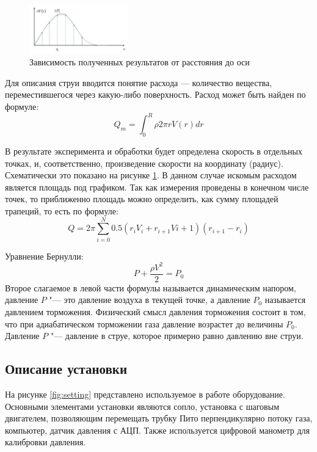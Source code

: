             \begin{figure}
                \includegraphics[width=0.38\textwidth]{data_example}
                \caption{Зависимость полученных результатов от расстояния до оси}
                \label{fig:data}
            \end{figure}
            Для описания струи вводится понятие расхода --- количество вещества, переместившегося через какую-либо поверхность. Расход может быть найден по формуле:
            \begin{equation}
                \label{eq:expence}
                Q_m = \int_0^R \rho 2\pi rV(r)dr
            \end{equation}

            В результате эксперимента и обработки будет определена скорость в отдельных точках, и, соответственно, произведение скорости на координату (радиус). Схематически это показано на рисунке \ref{fig:data}. В данном случае искомым расходом является площадь под графиком. Так как измерения проведены в конечном числе точек, то приближенно площадь можно определить, как сумму площадей трапеций, то есть по формуле:
            \begin{equation}
                \label{eq:final_expence}
                Q = 2\pi \sum_{i=0}^N 0.5\left(r_iV_i+r_{i+1}V{i+1}\right)\left(r_{i+1} - r_i\right)
            \end{equation}

            Уравнение Бернулли:
            \begin{equation}
                \label{eq:bernoulli}
                P + \frac{\rho V^2}{2} = P_0
            \end{equation}
            Второе слагаемое в левой части формулы называется динамическим напором, давление $P$ "--- это давление воздуха в текущей точке, а давление $P_0$ называется давлением торможения. Физический смысл давления торможения состоит в том, что при адиабатическом торможении газа давление возрастет до величины $P_0$. Давление $P$ "--- давление в струе, которое примерно равно давлению вне струи.
    
        \subsection*{Описание установки}
            На рисунке \ref{fig:setting} представлено используемое в работе оборудование. Основными элементами установки являются сопло, установка с шаговым двигателем, позволяющим перемещать трубку Пито перпендикулярно потоку газа, компьютер, датчик давления с АЦП. Также используется цифровой манометр для калибровки давления.
            
